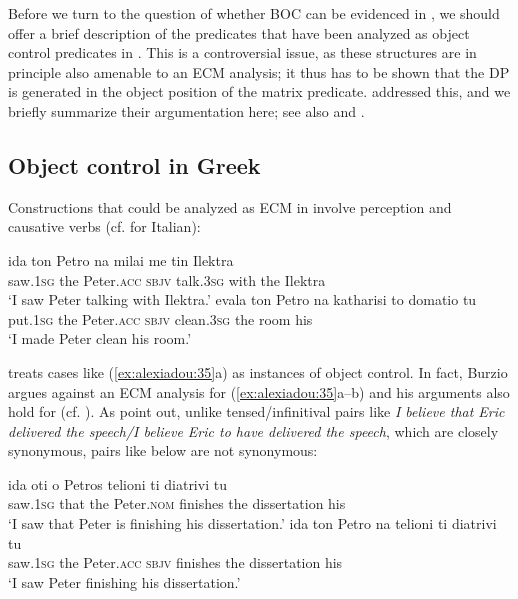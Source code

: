 \documentclass[output=paper]{langsci/langscibook}
\begin{document}
Before we turn to the question of whether BOC can be evidenced in , we should offer a brief description of the predicates that have been analyzed as object control predicates in . This is a controversial issue, as these structures are in principle also amenable to an ECM analysis; it thus has to be shown that the DP is generated in the object position of the matrix predicate. \citet{Alexiadou1997} addressed this, and we briefly summarize their argumentation here; see also \citet{Kotzoglou2002} and \citet{Kotzoglou2007}. 

\subsection{Object control in Greek}%
Constructions that could be analyzed as ECM in  involve perception and causative verbs (cf. \citealt{Burzio1986} for Italian):


\ea%
    \label{ex:alexiadou:35}
    \ea \gll ida          ton  Petro         na    milai     me   tin Ilektra\\
             saw{}.\textsc{1sg}  the   Peter{}.\textsc{acc}  \textsc{sbjv} talk.\textsc{3sg} with  the Ilektra\\
    \glt     ‘I saw Peter talking with Ilektra.’
    \ex
    \gll evala      ton Petro       na     katharisi   to   domatio tu\\ 
             put{}.\textsc{1sg}  the Peter{}.\textsc{acc} \textsc{sbjv}   clean.\textsc{3sg}  the  room     his\\
    \glt     ‘I made Peter clean his room.’
    \z
\z    

\citet{Iatridou1993} treats cases like (\ref{ex:alexiadou:35}a) as instances of object control. In fact, Burzio argues against an ECM analysis for (\ref{ex:alexiadou:35}a--b) and his arguments also hold for  (cf. \citealt[287--290]{Burzio1986}). As \citet{Alexiadou1997} point out, unlike tensed\slash infinitival pairs like \textit{I believe that Eric delivered the speech\slash I believe Eric to have delivered the speech}, which are closely synonymous, pairs like  below are not synonymous:

\ea%
    \label{ex:alexiadou:36}
    \ea
    \gll ida          oti   o    Petros         telioni   ti      diatrivi       tu\\
             saw{}.\textsc{1sg}  that  the Peter{}.\textsc{nom}   finishes  the  dissertation his\\
    \glt     ‘I saw that Peter is finishing his dissertation.’
    \ex
    \gll ida          ton  Petro      na     telioni   ti    diatrivi        tu\\
             saw{}.\textsc{1sg}  the  Peter{}.\textsc{acc} \textsc{sbjv} finishes the  dissertation his\\
    \glt     ‘I saw Peter finishing his dissertation.’
    \z
\z
\end{document}
